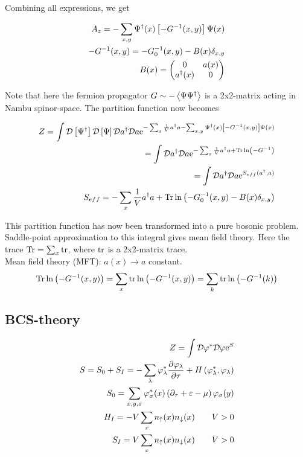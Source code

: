 Combining all expressions, we get 

\begin{align*}
    A_z = -\sum_{x,y} \Psi^{\dagger}(x)\left[ -G ^{-1}(x,y) \right]\Psi(x) \\
    -G ^{-1}(x,y) = -G_0 ^{-1}(x,y) - B(x)\delta_{x,y} \\ 
    B(x) = \begin{pmatrix} 0 & a(x) \\ a^{\dagger}(x) & 0 \end{pmatrix} 
\end{align*}

Note that here the fermion propagator $G \sim - \expval{\Psi \Psi^{\dagger}}$ is a 2x2-matrix acting in Nambu spinor-space. The partition function now becomes 

\begin{align*}
    Z = \int \mathcal{D} \left[ \Psi^{\dagger}\right] \mathcal{D} \left[\Psi\right]\mathcal{D} a^{\dagger} \mathcal{D} a \mathrm{e}^{-\sum_x \frac{1}{V}a^{\dagger} a -\sum_{x,y} \Psi^{\dagger}(x)\left[ -G ^{-1}(x,y) \right]\Psi(x)} \\ 
    = \int \mathcal{D} a^{\dagger} \mathcal{D} a \mathrm{e}^{-\sum_x \frac{1}{V}a^{\dagger} a + \Tr \ln \left(-G ^{-1}\right)} \\ 
    = \int \mathcal{D} a^{\dagger} \mathcal{D} a \mathrm{e}^{S_{eff}(a^{\dagger}, a)} \\ 
    S_{eff} = -\sum_x \frac{1}{V}a^{\dagger} a + \Tr \ln \left(-G_0 ^{-1}(x,y) -B(x)\delta_{x,y}\right)
\end{align*}

This partition function has now been transformed into a pure bosonic problem. Saddle-point approximation to this integral gives mean field theory. Here the trace $\Tr = \sum_{x} \tr$, where $\tr$ is a 2x2-matrix trace. \\ 

Mean field theory (MFT): $a(x) \to a$ constant. \\

\begin{equation*}
    \Tr \ln \left(-G ^{-1}(x,y)\right) = \sum_x \tr \ln \left(-G ^{-1}(x,y)\right) = \sum_k \tr \ln \left(-G ^{-1}(k)\right)
\end{equation*}

\subsection{BCS-theory}

\begin{align*}
    Z = \int \mathcal{D} \varphi^* \mathcal{D} \varphi \mathrm{e}^S \\ 
    S = S_0 + S_I = -\sum_\lambda \varphi_\lambda^* \pdv{\varphi_\lambda}{\tau} + H\left(\varphi_\lambda^*, \varphi_\lambda \right) \\ 
    S_0 = \sum_{x,y,\sigma} \varphi_\sigma ^* (x) \left( \partial_\tau + \varepsilon - \mu \right) \varphi_\sigma (y) \\ 
    H_I = -V \sum_x n_\uparrow(x) n_\downarrow(x) \quad \quad V > 0 \\ 
    S_I = V\sum_x n_\uparrow(x) n_\downarrow(x) \quad \quad V > 0
\end{align*}

